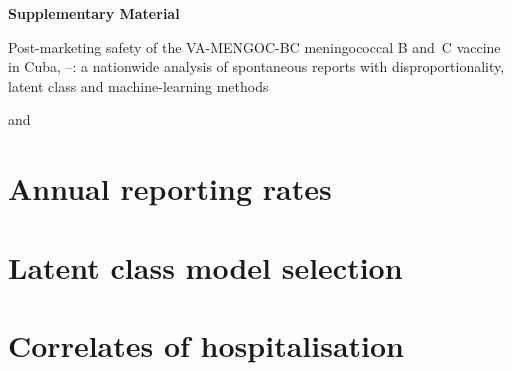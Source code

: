 \documentclass[11pt]{article}
\begin{document}
\SupplementaryNumbering
\SyntheticNotice
\begin{center}
{\Large\bfseries Supplementary Material\par}
\medskip
{\large Post-marketing safety of the VA-MENGOC-BC meningococcal B and~C vaccine in Cuba,
\VStudyFirstYear--\VStudyLastYear: a nationwide analysis of spontaneous reports with
disproportionality, latent class and machine-learning methods\par}
\medskip
{\small \AuthorOne{} and \AuthorTwo\par}
\end{center}

\tableofcontents

\section{Annual reporting rates}\label{sec:S-rates}
\begin{table}[htbp]
\centering\small
\caption{Annual AEFI reports involving VA-MENGOC-BC, doses administered and reporting rates per
\num{100000} doses with exact Poisson 95\% confidence intervals. The ratio compares each rate with
the programme's expected rate of \POExpectedRate{} per \num{100000} doses for all childhood
vaccines. Years without a dose denominator show a dash.}
\label{tab:S-rates}
\POTableRates
\end{table}

\section{Latent class model selection}\label{sec:S-lca}
\begin{table}[htbp]
\centering\small
\caption{Latent class models with $K=\POLCAKMin,\dots,\POLCAKMax$ classes fitted to the event indicators with a
prevalence of at least 0.5\%. The model with the lowest BIC was selected; ICL-BIC penalises
poorly separated classes and the entropy $R^2$ measures classification certainty (1 = perfect).}
\label{tab:S-lca}
\POTableLCASelection
\end{table}

\section{Correlates of hospitalisation}\label{sec:S-logistic}
\begin{table}[htbp]
\centering\small
\caption{Adjusted odds ratios of hospitalisation from the multivariable Firth logistic regression
fitted to the analysis population (Wald 95\% confidence intervals). Region contrasts are relative to the
western region; event and vaccine terms are present-versus-absent indicators. Terms recorded in
fewer than \VMinCell{} reports are suppressed.}
\label{tab:S-logistic}
\POTableLogistic
\end{table}
\end{document}
